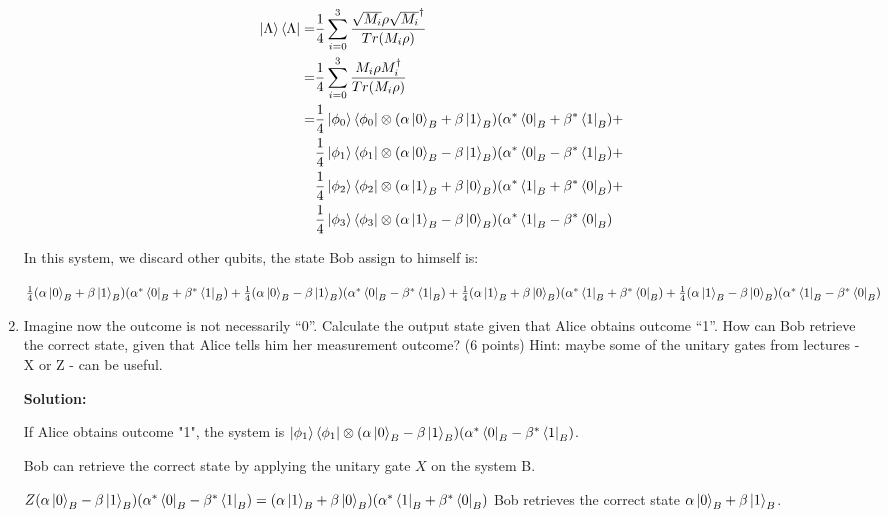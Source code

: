 \documentclass[12pt]{article}
\begin{document}
\begin{enumerate}
          \begin{align}
              \ket{\Lambda}\bra{\Lambda} = & \frac{1}{4}\sum_{i=0}^{3}\frac{\sqrt{M_i} \rho\sqrt{M_i}^{\dagger}}{Tr(M_i\rho)}                                 \\
              =                            & \frac{1}{4}\sum_{i=0}^{3}\frac{M_i \rho M_i^{\dagger}}{Tr(M_i\rho)}                                              \\
              =                            & \frac{1}{4}\ket{\phi_0}\bra{\phi_0}\otimes (\alpha\ket{0}_B+\beta\ket{1}_B)(\alpha^*\bra{0}_B+\beta^*\bra{1}_B)+ \\
                                           & \frac{1}{4}\ket{\phi_1}\bra{\phi_1}\otimes (\alpha\ket{0}_B-\beta\ket{1}_B)(\alpha^*\bra{0}_B-\beta^*\bra{1}_B)+ \\
                                           & \frac{1}{4}\ket{\phi_2}\bra{\phi_2}\otimes (\alpha\ket{1}_B+\beta\ket{0}_B)(\alpha^*\bra{1}_B+\beta^*\bra{0}_B)+ \\
                                           & \frac{1}{4}\ket{\phi_3}\bra{\phi_3}\otimes (\alpha\ket{1}_B-\beta\ket{0}_B)(\alpha^*\bra{1}_B-\beta^*\bra{0}_B)
          \end{align}


          In this system, we discard other qubits, the state Bob assign to himself is:

          $\frac{1}{4}(\alpha\ket{0}_B+\beta\ket{1}_B)(\alpha^*\bra{0}_B+\beta^*\bra{1}_B)+
              \frac{1}{4}(\alpha\ket{0}_B-\beta\ket{1}_B)(\alpha^*\bra{0}_B-\beta^*\bra{1}_B)+
              \frac{1}{4}(\alpha\ket{1}_B+\beta\ket{0}_B)(\alpha^*\bra{1}_B+\beta^*\bra{0}_B)+
              \frac{1}{4}(\alpha\ket{1}_B-\beta\ket{0}_B)(\alpha^*\bra{1}_B-\beta^*\bra{0}_B)$


    \item Imagine now the outcome is not necessarily “0”. Calculate the output state given that Alice obtains outcome
          “1”. How can Bob retrieve the correct state, given that Alice tells him her measurement outcome? (6 points)
          Hint: maybe some of the unitary gates from lectures - X or Z - can be useful.


          \textbf{Solution:}

          If Alice obtains outcome "1", the system is $\ket{\phi_1}\bra{\phi_1}\otimes (\alpha\ket{0}_B-\beta\ket{1}_B)(\alpha^*\bra{0}_B-\beta^*\bra{1}_B)$.

          Bob can retrieve the correct state by applying the unitary gate $X$ on the system B.

          $Z(\alpha\ket{0}_B-\beta\ket{1}_B)(\alpha^*\bra{0}_B-\beta^*\bra{1}_B) = (\alpha\ket{1}_B+\beta\ket{0}_B)(\alpha^*\bra{1}_B+\beta^*\bra{0}_B)$
          Bob retrieves the correct state $\alpha\ket{0}_B+\beta\ket{1}_B$.


\end{enumerate}
\end{document}
